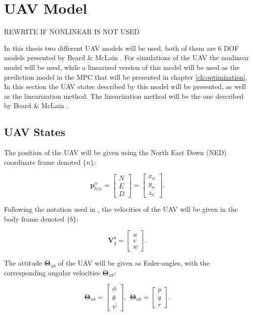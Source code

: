 \section{UAV Model}
\label{sec:model}

REWRITE IF NONLINEAR IS NOT USED

In this thesis two different UAV models will be used, both of them are 6 DOF models presented by Beard \& McLain \cite{uavBEARD}. For simulations of the UAV the nonlinear model will be used, while a linearized version of this model will be used as the prediction model in the MPC that will be presented in chapter \ref{ch:optimization}. In this section the UAV states described by this model will be presented, as well as the linearization method. The linearization method will be the one described by Beard \& McLain \cite{uavBEARD}.

\subsection{UAV States}

The position of the UAV will be given using the North East Down (NED) coordinate frame denoted $\{n\}$:

\begin{equation}
	\mathbf{p}_{b/n}^n =
	\begin{bmatrix}
		N \\ E \\ D
	\end{bmatrix}
	=
	\begin{bmatrix}
		x_n \\ y_n \\ z_n
	\end{bmatrix}.
\end{equation}

Following the notation used in \cite{uavBEARD}, the velocities of the UAV will be given in the body frame denoted $\{b\}$:

\begin{equation}
	\mathbf{V}^b_g =
	\begin{bmatrix}
		u \\ v \\ w
	\end{bmatrix}.
\end{equation}

The attitude $\bm{\Theta}_{nb}$ of the UAV will be given as Euler-angles, with the corresponding angular velocities $\bm{\dot{\Theta}}_{nb}$:

\begin{equation}
	\bm{\Theta}_{nb} =
	\begin{bmatrix}
		\phi \\ \theta \\ \psi
	\end{bmatrix},
	\hspace{5pt}
	\dot{\bm{\Theta}}_{nb} =
	\begin{bmatrix}
		p \\ q \\ r
	\end{bmatrix}.
\end{equation}


